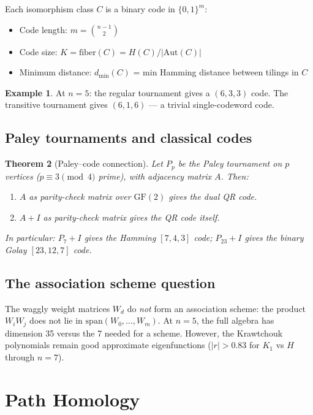 \documentclass[11pt,a4paper]{article}
\newtheorem{theorem}{Theorem}[section]
\theoremstyle{definition}
\newtheorem{example}[theorem]{Example}
\theoremstyle{remark}
\newcommand{\Aut}{\mathrm{Aut}}
\begin{document}
Each isomorphism class $C$ is a binary code in $\{0, 1\}^m$:
\begin{itemize}
\item Code length: $m = \binom{n-1}{2}$
\item Code size: $K = \mathrm{fiber}(C) = H(C)/|\Aut(C)|$
\item Minimum distance: $d_{\min}(C)$ = min Hamming distance between tilings in $C$
\end{itemize}

\begin{example}
At $n = 5$: the regular tournament gives a $(6, 3, 3)$ code. The transitive tournament gives $(6, 1, 6)$ --- a trivial single-codeword code.
\end{example}

\subsection{Paley tournaments and classical codes}

\begin{theorem}[Paley--code connection]
\label{thm:paley}
Let $P_p$ be the Paley tournament on $p$ vertices ($p \equiv 3 \pmod{4}$ prime), with adjacency matrix $A$. Then:
\begin{enumerate}
\item $A$ as parity-check matrix over $\mathrm{GF}(2)$ gives the \emph{dual} QR code.
\item $A + I$ as parity-check matrix gives the QR code itself.
\end{enumerate}
In particular: $P_7 + I$ gives the Hamming $[7, 4, 3]$ code; $P_{23} + I$ gives the binary Golay $[23, 12, 7]$ code.
\end{theorem}

\subsection{The association scheme question}

The waggly weight matrices $W_d$ do \emph{not} form an association scheme: the product $W_i W_j$ does not lie in $\mathrm{span}(W_0, \ldots, W_m)$. At $n = 5$, the full algebra has dimension 35 versus the 7 needed for a scheme. However, the Krawtchouk polynomials remain good approximate eigenfunctions ($|r| > 0.83$ for $K_1$ vs $H$ through $n = 7$).

\section{Path Homology}
\label{sec:homology}
\end{document}

